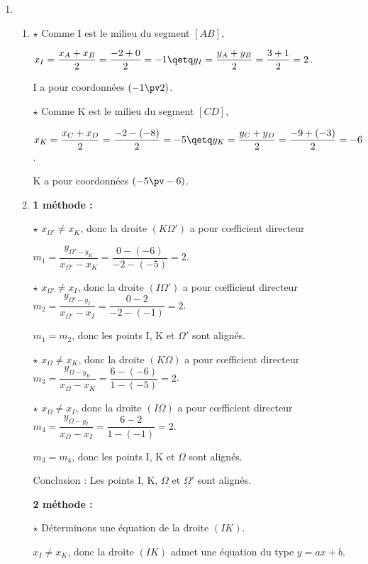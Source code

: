 \documentclass[12pt,french]{article}
\begin{document}
\begin{spacing}{1.2}
\begin{enumerate}[label=\arabic*.]
\begin{enumerate}[label=\alph*)]
	\end{enumerate}

\item %

	\begin{enumerate}[label=\alph*)]
	\item %
	$\star$ Comme I est le milieu du segment $[AB]$, 
	
	$x_I=\dfrac{x_A+x_B}{2}=\dfrac{-2+0}{2}=-1\qetq y_I=\dfrac{y_A+y_B}{2}=\dfrac{3+1}{2}=2$.
	
	I a pour coordonnées $(-1\pv 2)$.
	
	$\star$ Comme K est le milieu du segment $[CD]$,
	
	$x_K=\dfrac{x_C+x_D}{2}=\dfrac{-2-(-8)}{2}=-5\qetq y_K=\dfrac{y_C+y_D}{2}=\dfrac{-9+(-3)}{2}=-6$.
	
	K a pour coordonnées $(-5\pv -6)$.
	
	\item %
	\textbf{1 méthode :}
	
	$\star$ $x_{\Omega '}\neq x_K$, donc la droite $(K\Omega ')$ a pour c\oe{}fficient directeur 
	
	$m_1=\dfrac{y_{\Omega '-y_K}}{x_{\Omega '}-x_K}=\dfrac{0-(-6)}{-2-(-5)}=2$.
	
	$\star$ $x_{\Omega '}\neq x_I$, donc la droite $(I\Omega ')$ a pour c\oe{}fficient directeur $m_2=\dfrac{y_{\Omega '-y_I}}{x_{\Omega '}-x_I}=\dfrac{0-2}{-2-(-1)}=2$.
	
	$m_1=m_2$, donc les points I, K et $\Omega '$ sont alignés.
	
	$\star$ $x_{\Omega}\neq x_K$, donc la droite $(K\Omega)$ a pour c\oe{}fficient directeur $m_3=\dfrac{y_{\Omega-y_K}}{x_{\Omega}-x_K}=\dfrac{6-(-6)}{1-(-5)}=2$.
	
	$\star$ $x_{\Omega}\neq x_I$, donc la droite $(I\Omega)$ a pour c\oe{}fficient directeur $m_4=\dfrac{y_{\Omega-y_I}}{x_{\Omega}-x_I}=\dfrac{6-2}{1-(-1)}=2$.
	
	$m_3=m_4$, donc les points I, K et $\Omega$ sont alignés.
	
	Conclusion : Les points I, K, $\Omega$ et $\Omega '$ sont alignés.

	\textbf{2 méthode :}
	
	$\star$ Déterminons une équation de la droite $(IK)$.
	
	$x_I\neq x_K$, donc la droite $(IK)$ admet une équation du type $y=ax+b$.
	

\end{enumerate}
\end{enumerate}
\end{spacing}
\end{document}
